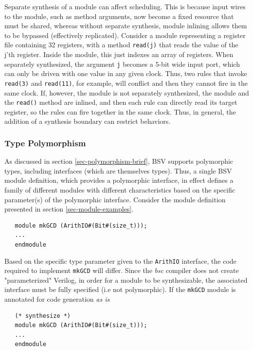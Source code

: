 \documentclass[twoside,letterpaper]{article}
\newcommand{\BSV}{BSV}
\newcommand{\bsc}{\emph{bsc}}
\newcommand{\te}[1]{\texttt{#1}}
\begin{document}
Separate synthesis of a module can affect scheduling.  This is because
input wires to the module, such as method arguments, now become a
fixed resource that must be shared, whereas without separate
synthesis, module inlining allows them to be bypassed (effectively
replicated).  Consider a module representing a register file
containing 32 registers, with a method \te{read(j)} that reads the
value of the j'th register.  Inside the module, this just indexes an
array of registers.  When separately synthesized, the argument \te{j}
becomes a 5-bit wide input port, which can only be driven with one
value in any given clock.  Thus, two rules that invoke \te{read(3)}
and \te{read(11)}, for example, will conflict and then they cannot fire
in the same clock.  If, however, the module is not separately
synthesized, the module and the \te{read()} method are inlined, and
then each rule can directly read its target register, so the rules can fire
together in the same clock.  Thus, in general, the addition of a
synthesis boundary can restrict behaviors.


\subsubsection{Type Polymorphism}

As discussed in section \ref{sec-polymorphism-brief}, {\BSV} supports
polymorphic types, including interfaces (which are themselves types).
Thus, a single {\BSV} module definition, which provides a polymorphic
interface, in effect defines a family of different modules with
different characteristics based on the specific parameter(s) of the
polymorphic interface.  Consider the module definition presented in
section
\ref{sec-module-examples}.

\begin{verbatim}
   module mkGCD (ArithIO#(Bit#(size_t)));
   ...
   endmodule
\end{verbatim}

Based on the specific type parameter given to the \texttt{ArithIO}
interface, the code required to implement \texttt{mkGCD} will differ.
Since the {\bsc} compiler does not create "parameterized" Verilog, in
order for a module to be synthesizable, the associated interface must
be fully specified (i.e not polymorphic).  If the \texttt{mkGCD}
module is annotated for code generation \emph{as is}

\begin{verbatim}
   (* synthesize *)
   module mkGCD (ArithIO#(Bit#(size_t)));
   ...
   endmodule
\end{verbatim}
\end{document}
